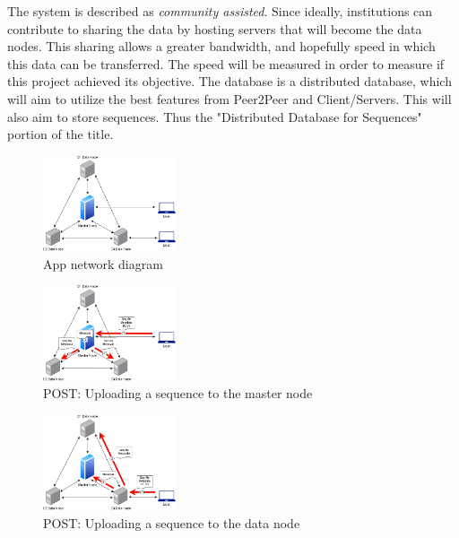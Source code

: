 \documentclass{article}
\begin{document}

The system is described as \textit{community assisted}. Since ideally, institutions can contribute to sharing the data by hosting servers that will become the data nodes. This sharing allows a greater bandwidth, and hopefully speed in which this data can be transferred. The speed will be measured in order to measure if this project achieved its objective. The database is a distributed database, which will aim to utilize the best features from Peer2Peer and Client/Servers. This will also aim to store sequences. Thus the "Distributed Database for Sequences" portion of the title.

\begin{figure}[h]
\caption{App network diagram}
\centering
\includegraphics[width=0.35\textwidth]{images/thesis1.png} 
\end{figure}


\begin{figure}[h]
\caption{POST: Uploading a sequence to the master node}
\centering
\includegraphics[width=0.35\textwidth]{images/thesis3.png} 
\end{figure}

\begin{figure}[h]
\caption{POST: Uploading a sequence to the data node}
\centering
\includegraphics[width=0.35\textwidth]{images/thesis2.png} 
\end{figure}
\end{document}
